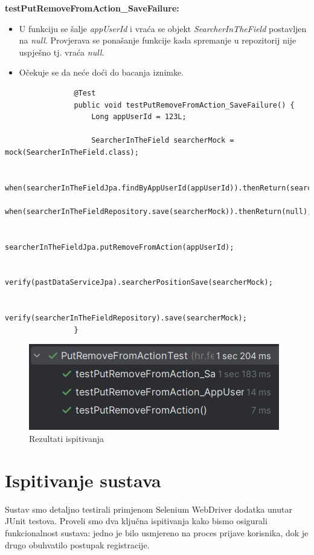 			\textbf{testPutRemoveFromAction\_SaveFailure:}
			\begin{itemize}
				\item U funkciju se šalje \textit{appUserId} i vraća se objekt \textit{SearcherInTheField} postavljen na \textit{null}. Provjerava se ponašanje funkcije kada spremanje u repozitorij nije uspješno tj. vraća \textit{null}.
				\item Očekuje se da neće doći do bacanja iznimke.
			\end{itemize}
			\begin{lstlisting}
				@Test
				public void testPutRemoveFromAction_SaveFailure() {
					Long appUserId = 123L;
					
					SearcherInTheField searcherMock = mock(SearcherInTheField.class);
					
					when(searcherInTheFieldJpa.findByAppUserId(appUserId)).thenReturn(searcherMock);
					when(searcherInTheFieldRepository.save(searcherMock)).thenReturn(null);
					
					searcherInTheFieldJpa.putRemoveFromAction(appUserId);
					
					verify(pastDataServiceJpa).searcherPositionSave(searcherMock);
					
					verify(searcherInTheFieldRepository).save(searcherMock);
				}
			\end{lstlisting}
			
			\begin{figure}[H]
				\includegraphics[scale=1]{slike/putRemoveFromActionTest.png} 
				\centering
				\caption{Rezultati ispitivanja}
				\label{fig:putRemoveFromActionTest}
			\end{figure}
			
			
			\section{Ispitivanje sustava}
			
			
			Sustav smo detaljno testirali primjenom Selenium WebDriver dodatka unutar JUnit testova. Proveli smo dva ključna ispitivanja kako bismo osigurali funkcionalnost sustava: jedno je bilo usmjereno na proces prijave korisnika, dok je drugo obuhvatilo postupak registracije.
			
